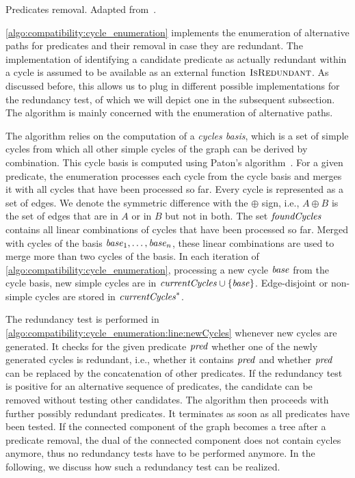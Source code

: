 \begin{algorithm}
    
    \caption[Removal of redundant predicates]{Predicates removal. Adapted from~.}
    \label{algo:compatibility:cycle_enumeration}
\end{algorithm}

\autoref{algo:compatibility:cycle_enumeration} implements the enumeration of alternative paths for predicates and their removal in case they are redundant.
The implementation of identifying a candidate predicate as actually redundant within a cycle is assumed to be available as an external function $\textsc{IsRedundant}$.
As discussed before, this allows us to plug in different possible implementations for the redundancy test, of which we will depict one in the subsequent subsection.
The algorithm is mainly concerned with the enumeration of alternative paths.

The algorithm relies on the computation of a \emph{cycles basis}, which is a set of simple cycles from which all other simple cycles of the graph can be derived by combination.
This cycle basis is computed using Paton's algorithm~\cite{paton1969algorithm}.
For a given predicate, the enumeration processes each cycle from the cycle basis and merges it with all cycles that have been processed so far. 
Every cycle is represented as a set of edges.
We denote the symmetric difference with the $\oplus$ sign, i.e., $A \oplus B$ is the set of edges that are in $A$ or in $B$ but not in both.
The set $\mathit{foundCycles}$ contains all linear combinations of cycles that have been processed so far.
Merged with cycles of the basis $\mathit{base}_1, \dots, \mathit{base}_n$, these linear combinations are used to merge more than two cycles of the basis.
In each iteration of \autoref{algo:compatibility:cycle_enumeration}, processing a new cycle $\mathit{base}$ from the cycle basis, new simple cycles are in $\mathit{currentCycles} \cup \{ \mathit{base} \}$. Edge-disjoint or non-simple cycles are stored in $\mathit{currentCycles}^*$.

The redundancy test is performed in \autoref{algo:compatibility:cycle_enumeration:line:newCycles} whenever new cycles are generated.
It checks for the given predicate $\mathit{pred}$ whether one of the newly generated cycles is redundant, i.e., whether it contains $\mathit{pred}$ and whether $\mathit{pred}$ can be replaced by the concatenation of other predicates.
If the redundancy test is positive for an alternative sequence of predicates, the candidate can be removed without testing other candidates.
The algorithm then proceeds with further possibly redundant predicates.
It terminates as soon as all predicates have been tested.
If the connected component of the graph becomes a tree after a predicate removal, the dual of the connected component does not contain cycles anymore, thus no redundancy tests have to be performed anymore.
In the following, we discuss how such a redundancy test can be realized.

